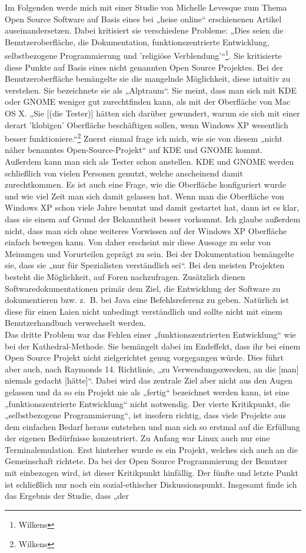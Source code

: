 \documentclass[a4paper,12pt]{article}
\begin{document}
Im Folgenden werde mich mit einer Studie von Michelle Levesque zum Thema Open Source Software auf Basis eines bei „heise online“ erschienenen Artikel auseinandersetzen. Dabei kritisiert sie verschiedene Probleme: „Dies seien die Benutzeroberfläche, die Dokumentation, funktionszentrierte Entwicklung, selbstbezogene Programmierung und 'religiöse Verblendung'“\footnote{Wilkens}. Sie kritisierte diese Punkte auf Basis eines nicht genannten Open Source Projektes. Bei der Benutzeroberfläche bemängelte sie die mangelnde Möglichkeit, diese intuitiv zu verstehen. Sie bezeichnete sie als „Alptraum“. Sie meint, dass man sich mit KDE oder GNOME weniger gut zurechtfinden kann, als mit der Oberfläche von Mac OS X. „Sie [(die Tester)] hätten sich darüber gewundert, warum sie sich mit einer derart 'klobigen' Oberfläche beschäftigen sollen, wenn Windows XP wesentlich besser funktioniere.“\footnote{Wilkens} Zuerst einmal frage ich mich, wie sie von diesem „nicht näher benanntes Open-Source-Projekt“ auf KDE und GNOME kommt. Außerdem kann man sich als Tester schon anstellen. KDE und GNOME werden schließlich von vielen Personen genutzt, welche anscheinend damit zurechtkommen. Es ist auch eine Frage, wie die Oberfläche konfiguriert wurde und wie viel Zeit man sich damit gelassen hat. Wenn man die Oberfläche von Windows XP schon viele Jahre benutzt und damit gestartet hat, dann ist es klar, dass sie einem auf Grund der Bekanntheit besser vorkommt. Ich glaube außerdem nicht, dass man sich ohne weiteres Vorwissen auf der Windows XP Oberfläche einfach bewegen kann. Von daher erscheint mir diese Aussage zu sehr von Meinungen und Vorurteilen geprägt zu sein. Bei der Dokumentation bemängelte sie, dass sie „nur für Spezialisten verständlich sei“\footnotemark[33]. Bei den meisten Projekten besteht die Möglichkeit, auf Foren nachzufragen. Zusätzlich dienen Softwaredokumentationen primär dem Ziel, die Entwicklung der Software zu dokumentieren bzw. z.~B. bei Java eine Befehlsreferenz zu geben. Natürlich ist diese für einen Laien nicht unbedingt verständlich und sollte nicht mit einem Benutzerhandbuch verwechselt werden.\\ Das dritte Problem war das Fehlen einer „funktionszentrierten Entwicklung“ wie bei der Kathedral-Methode. Sie bemängelt dabei im Endeffekt, dass ihr bei einem Open Source Projekt nicht zielgerichtet genug vorgegangen würde. Dies führt aber auch, nach Raymonds 14. Richtlinie, „zu Verwendungszwecken, an die [man] niemals gedacht [hätte]“. Dabei wird das zentrale Ziel aber nicht aus den Augen gelassen und da so ein Projekt nie als „fertig“ bezeichnet werden kann, ist eine „funktionszentrierte Entwicklung“ nicht notwendig. Der vierte Kritikpunkt, die „selbstbezogene Programmierung“, ist insofern richtig, dass viele Projekte aus dem einfachen Bedarf heraus entstehen und man sich so erstmal auf die Erfüllung der eigenen Bedürfnisse konzentriert. Zu Anfang war Linux auch nur eine Terminalemulation. Erst hinterher wurde es ein Projekt, welches sich auch an die Gemeinschaft richtete. Da bei der Open Source Programmierung der Benutzer mit einbezogen wird, ist dieser Kritikpunkt hinfällig. Der fünfte und letzte Punkt ist schließlich nur noch ein sozial-ethischer Diskussionspunkt. Insgesamt finde ich das Ergebnis der Studie, dass „der 
\end{document}
